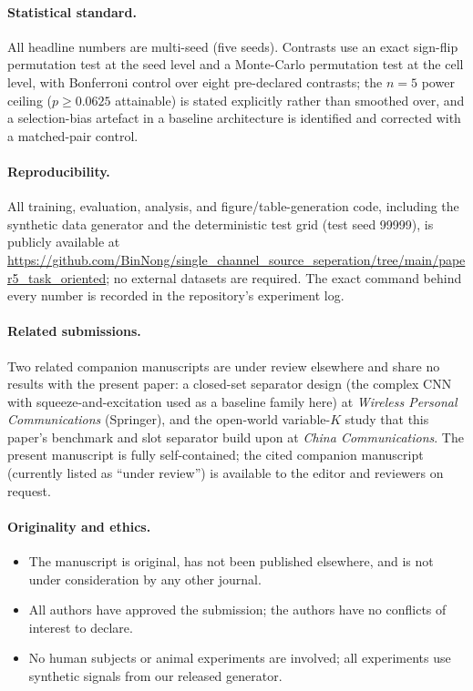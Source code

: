 \documentclass[11pt,a4paper]{article}
\begin{document}
\paragraph{Statistical standard.}
All headline numbers are multi-seed (five seeds). Contrasts use an
exact sign-flip permutation test at the seed level and a Monte-Carlo
permutation test at the cell level, with Bonferroni control over eight
pre-declared contrasts; the $n{=}5$ power ceiling ($p \geq 0.0625$
attainable) is stated explicitly rather than smoothed over, and a
selection-bias artefact in a baseline architecture is identified and
corrected with a matched-pair control.

\paragraph{Reproducibility.}
All training, evaluation, analysis, and figure/table-generation code,
including the synthetic data generator and the deterministic test grid
(test seed 99999), is publicly available at
\url{https://github.com/BinNong/single_channel_source_seperation/tree/main/paper5_task_oriented};
no external datasets are required. The exact command behind every
number is recorded in the repository's experiment log.

\paragraph{Related submissions.}
Two related companion manuscripts are under review elsewhere and share no
results with the present paper: a closed-set separator design (the
complex CNN with squeeze-and-excitation used as a baseline family here)
at \emph{Wireless Personal Communications} (Springer), and the
open-world variable-$K$ study that this paper's benchmark and slot
separator build upon at \emph{China Communications}. The present
manuscript is fully self-contained; the cited companion manuscript
(currently listed as ``under review'') is available to the editor and
reviewers on request.

\paragraph{Originality and ethics.}
\begin{itemize}
\item The manuscript is original, has not been published elsewhere, and
is not under consideration by any other journal.
\item All authors have approved the submission; the authors have no
conflicts of interest to declare.
\item No human subjects or animal experiments are involved; all
experiments use synthetic signals from our released generator.
\end{itemize}
\end{document}
